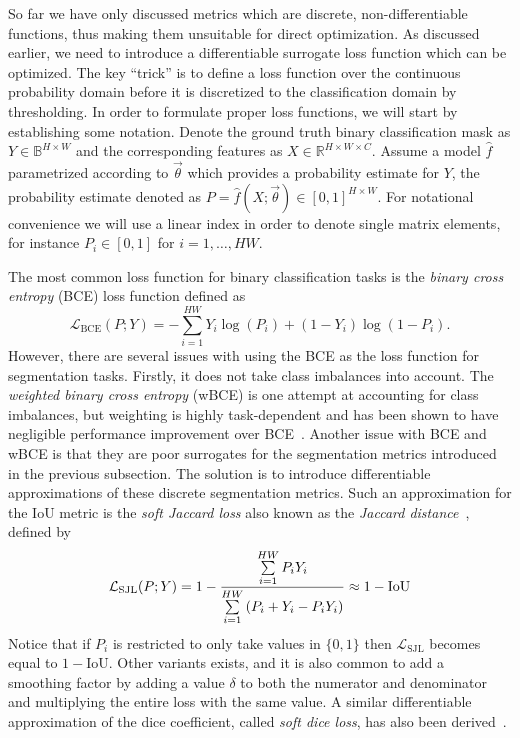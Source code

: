 So far we have only discussed metrics which are discrete, non-differentiable functions, thus making them unsuitable for direct optimization.
As discussed earlier, we need to introduce a differentiable surrogate loss function which can be optimized.
The key \enquote{trick} is to define a loss function over the continuous probability domain before it is discretized to the classification domain by thresholding.
In order to formulate proper loss functions, we will start by establishing some notation.
Denote the ground truth binary classification mask as $Y \in \mathbb{B}^{H \times W}$ and the corresponding features as $X \in \mathbb{R}^{H \times W \times C}$.
Assume a model $\hat{f}$ parametrized according to $\vec{\theta}$ which provides a probability estimate for $Y$, the probability estimate denoted as $P = \hat{f}(X; \vec{\theta}) \in [0, 1]^{H \times W}$.
For notational convenience we will use a linear index in order to denote single matrix elements, for instance $P_i \in [0, 1]$ for $i = 1, \ldots, HW$.

The most common loss function for binary classification tasks is the \textit{binary cross entropy} (BCE) loss function defined as
%
\begin{equation}
  \mathcal{L}_{\mathrm{BCE}}(P; Y)
  =
  - \sum\limits_{i = 1}^{HW}
  Y_i \log{(P_i)}
  +
  (1 - Y_i) \log{(1 - P_i)}.
  \label{eq:binary-cross-entropy}
\end{equation}
%
However, there are several issues with using the BCE as the loss function for segmentation tasks.
Firstly, it does not take class imbalances into account.
The \textit{weighted binary cross entropy} (wBCE) is one attempt at accounting for class imbalances, but weighting is highly task-dependent and has been shown to have negligible performance improvement over BCE~\cite[p.~98]{soft-losses}.
Another issue with BCE and wBCE is that they are poor surrogates for the segmentation metrics introduced in the previous subsection.
The solution is to introduce differentiable approximations of these discrete segmentation metrics.
Such an approximation for the IoU metric is the \textit{soft Jaccard loss} also known as the \textit{Jaccard distance}~\cite{jaccard-loss-with-equation}, defined by
%
\begin{equation}
  \mathcal{L}_{\mathrm{SJL}}(P; Y)
  =
  1
  -
  \frac{%
    \sum\limits_{i = 1}^{HW}
    P_i Y_i
  }{%
    \sum\limits_{i = 1}^{HW} \left(
      P_i
      +
      Y_i
      -
      P_i Y_i
    \right)
  }
  \approx
  1 - \mathrm{IoU}
  \label{eq:soft-jaccard-loss}
\end{equation}
%
Notice that if $P_i$ is restricted to only take values in $\{0, 1\}$ then $\mathcal{L}_{\mathrm{SJL}}$ becomes equal to $1 - \mathrm{IoU}$.
Other variants exists, and it is also common to add a smoothing factor by adding a value $\delta$ to both the numerator and denominator and multiplying the entire loss with the same value.
A similar differentiable approximation of the dice coefficient, called \textit{soft dice loss}, has also been derived~\cite{original-soft-dice-loss}.

